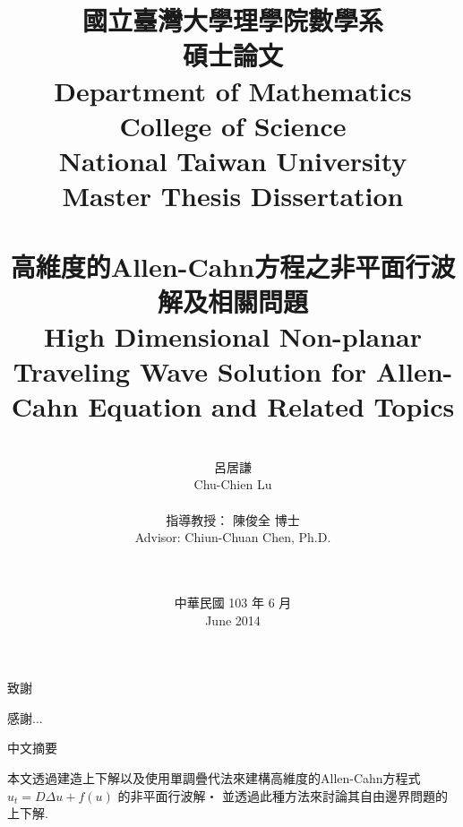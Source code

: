 \documentclass[12pt, a4paper]{article}
\numberwithin{equation}{section}
\begin{document}
\begin{CJK}{UTF8}{bkai}
\title{\Large
		國立臺灣大學理學院數學系 \\
		碩士論文 \\
		Department of Mathematics College of Science 	\\
		National Taiwan University \\
		Master Thesis Dissertation\\ \quad \\
		高維度的Allen-Cahn方程之非平面行波解及相關問題 \\
		High Dimensional Non-planar Traveling Wave Solution for Allen-Cahn Equation and  Related Topics
		}


\author{\large
		\quad \\
		呂居謙 \\
		Chu-Chien Lu\\
		\quad \\
		指導教授： 陳俊全 博士\\
		Advisor: Chiun-Chuan Chen, Ph.D.
		}

\date{
		\quad \\
		\quad \\
		中華民國 103 年 6 月 \\
		June 2014
		}

\maketitle


\thispagestyle{empty}
	
\clearpage







	\quad

\clearpage



\begin{center} \large 致謝 \end{center}
感謝...

\clearpage









\begin{center} \large 中文摘要 \end{center}
	本文透過建造上下解以及使用單調疊代法來建構高維度的Allen-Cahn方程式 $u_t=D\Delta u+f(u)$ 的非平面行波解‧ 並透過此種方法來討論其自由邊界問題的上下解.
\clearpage





\end{CJK}
\end{document}
